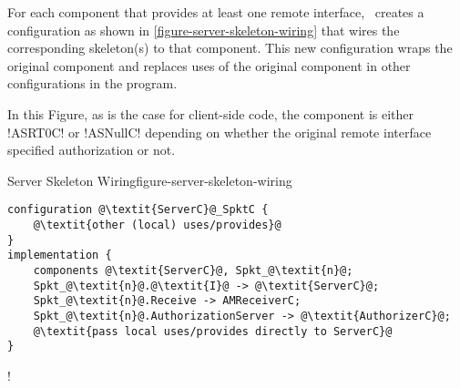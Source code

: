 For each component that provides at least one remote interface, \Sprocket\ creates a
configuration as shown in \autoref{figure-server-skeleton-wiring} that wires the corresponding
skeleton(s) to that component. This new configuration wraps the original component and replaces
uses of the original component in other configurations in the program.

In this Figure, as is the case for client-side code, the  component
is either !ASRT0C! or !ASNullC! depending on whether the original remote interface specified
authorization or not.


\begin{fpfig}[t]{Server Skeleton Wiring}{figure-server-skeleton-wiring}
{
\singlespace
\begin{lstlisting}[escapechar=@]
configuration @\textit{ServerC}@_SpktC {
    @\textit{other (local) uses/provides}@
}
implementation {
    components @\textit{ServerC}@, Spkt_@\textit{n}@;
    Spkt_@\textit{n}@.@\textit{I}@ -> @\textit{ServerC}@;
    Spkt_@\textit{n}@.Receive -> AMReceiverC;
    Spkt_@\textit{n}@.AuthorizationServer -> @\textit{AuthorizerC}@;
    @\textit{pass local uses/provides directly to ServerC}@
}
\end{lstlisting}
\primaryspacing
}
\end{fpfig}

\lstDeleteShortInline!

